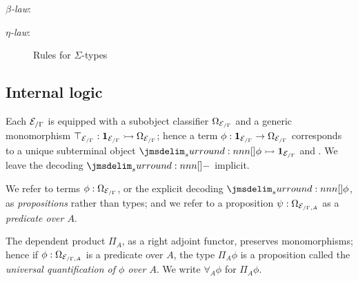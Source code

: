 \documentclass[a4paper]{article}
\begin{document}
\todo \emph{$\beta$-law}:

\todo \emph{$\eta$-law}:

\begin{figure}
  \centering
  \caption{Rules for $\Sigma$-types}
  \label{fig:0002}
\end{figure}

\subsection{Internal logic}

Each $\mathcal{E}_{/\Gamma}$ is equipped with a subobject classifier $\Omega_{\mathcal{E}_{/\Gamma}}$ and a generic monomorphism $\top_{\mathcal{E}_{/\Gamma}} : \mathbf{1}_{\mathcal{E}_{/\Gamma}} \rightarrowtail \Omega_{\mathcal{E}_{/\Gamma}}$; hence a term $\phi : \mathbf{1}_{\mathcal{E}_{/\Gamma}} \to \Omega_{\mathcal{E}_{/\Gamma}}$ corresponds to a unique subterminal object $\name{\phi} \mono \termObj{\EGamma}$ and \viceversa.
We leave the decoding $\name{-}$ implicit.

We refer to terms $\phi : \Omega_{\mathcal{E}_{/\Gamma}}$, or the explicit decoding $\name{\phi}$, as \emph{propositions} rather than types; and we refer to a proposition $\psi : \Omega_{\mathcal{E}_{/\Gamma,A}}$ as a \emph{predicate over $A$}.

The dependent product $\Pi_A$, as a right adjoint functor, preserves monomorphisms; hence if $\phi : \Omega_{\mathcal{E}_{/\Gamma,A}}$ is a predicate over $A$, the type $\Pi_A\phi$ is a proposition called the \emph{universal quantification of $\phi$ over $A$}.
We write $\forall_A\phi$ for $\Pi_A\phi$.
\end{document}
